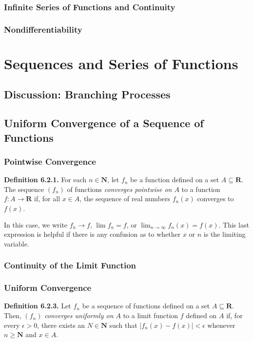 \documentclass[12pt]{report}
\newcommand{\R}{\textbf{R}}
\newcommand{\N}{\textbf{N}}
\begin{document}
\subsection*{Infinite Series of Functions and Continuity}
\subsection*{Nondifferentiability}

\chapter{Sequences and Series of Functions}
\section{Discussion: Branching Processes}

\section{Uniform Convergence of a Sequence of Functions}
\subsection*{Pointwise Convergence}

\noindent \textbf{Definition 6.2.1.} For each $n\in\N$, let $f_n$ be a function defined on a set $A\subseteq\R$. The sequence $(f_n)$ of functions \textit{converges pointwise on $A$} to a function $f:A\rightarrow\R$ if, for all $x\in A$, the sequence of real numbers $f_n(x)$ converges to $f(x)$.

In this case, we write $f_n\rightarrow f$, $\lim f_n=f$, or $\lim_{n\rightarrow\infty}f_n(x)=f(x)$. This last expression is helpful if there is any confusion as to whether $x$ or $n$ is the limiting variable.
\bigskip

\subsection*{Continuity of the Limit Function}

\subsection*{Uniform Convergence}

\noindent \textbf{Definition 6.2.3.} Let $f_n$ be a sequence of functions defined on a set $A\subseteq\R$.  Then, $(f_n)$ \textit{converges uniformly on $A$} to a limit function $f$ defined on $A$ if, for every $\epsilon>0$, there exists an $N\in\N$ such that $|f_n(x)-f(x)|<\epsilon$ whenever $n\geq\N$ and $x\in A$.
\bigskip
\end{document}
